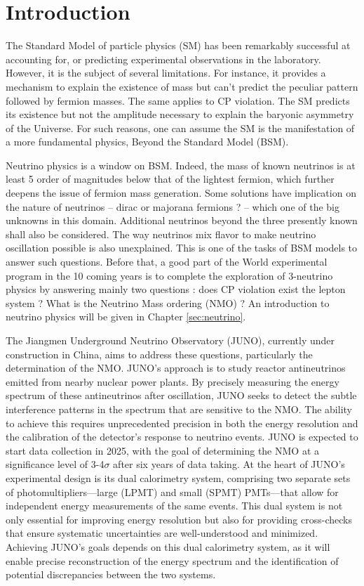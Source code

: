 \chapter*{Introduction}

The Standard Model of particle physics (SM) has been remarkably successful at accounting for, or predicting experimental observations in the laboratory.
However, it is the subject of several limitations. For instance, it provides a mechanism to explain the existence of mass but can't predict the peculiar pattern followed by fermion masses.
The same applies to CP violation. The SM predicts its existence but not the amplitude necessary to explain the baryonic asymmetry of the Universe. For such reasons, one can assume the SM is the manifestation of a more fundamental physics, Beyond the Standard Model (BSM).

Neutrino physics is a window on BSM. Indeed, the mass of known neutrinos is at least 5 order of magnitudes below that of the lightest fermion, which further deepens
the issue of fermion mass generation.
Some solutions have implication on the nature of neutrinos -- dirac or majorana fermions ?  --  which one of the big unknowns in this domain. Additional neutrinos beyond the three presently known shall also be considered. The way neutrinos mix flavor to make neutrino oscillation possible is also unexplained.
This is one of the tasks of BSM models to answer such questions. Before that, a good part of the World experimental program in the 10 coming years is to complete the exploration of 3-neutrino physics by answering mainly two questions :
does CP violation exist the lepton system ? What is the Neutrino Mass ordering (NMO) ?
An introduction to neutrino physics will be given in Chapter \ref{sec:neutrino}.

\hfill

The Jiangmen Underground Neutrino Observatory (JUNO), currently under construction in China, aims to address these questions, particularly the determination of the NMO. JUNO's approach is to study reactor antineutrinos emitted from nearby nuclear power plants. By precisely measuring the energy spectrum of these antineutrinos after oscillation, JUNO seeks to detect the subtle interference patterns in the spectrum that are sensitive to the NMO. The ability to achieve this requires unprecedented precision in both the energy resolution and the calibration of the detector’s response to neutrino events. JUNO is expected to start data collection in 2025, with the goal of determining the NMO at a significance level of 3-4$\sigma$ after six years of data taking.
At the heart of JUNO’s experimental design is its dual calorimetry system, comprising two separate sets of photomultipliers—large (LPMT) and small (SPMT) PMTs—that allow for independent energy measurements of the same events. This dual system is not only essential for improving energy resolution but also for providing cross-checks that ensure systematic uncertainties are well-understood and minimized. Achieving JUNO’s goals depends on this dual calorimetry system, as it will enable precise reconstruction of the energy spectrum and the identification of potential discrepancies between the two systems.


